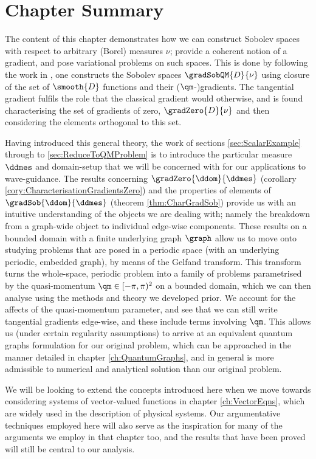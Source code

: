 \section{Chapter Summary}
The content of this chapter demonstrates how we can construct Sobolev spaces with respect to arbitrary (Borel) measures $\nu$; provide a coherent notion of a gradient, and pose variational problems on such spaces.
This is done by following the work in \cite{zhikov2000extension}, one constructs the Sobolev spaces $\gradSobQM{D}{\nu}$ using closure of the set of $\smooth{D}$ functions and their ($\qm$-)gradients.
The tangential gradient fulfils the role that the classical gradient would otherwise, and is found characterising the set of gradients of zero, $\gradZero{D}{\nu}$ and then considering the elements orthogonal to this set. \newline

Having introduced this general theory, the work of sections \ref{sec:ScalarExample} through to \ref{sec:ReduceToQMProblem} is to introduce the particular measure $\ddmes$ and domain-setup that we will be concerned with for our applications to wave-guidance.
The results concerning $\gradZero{\ddom}{\ddmes}$ (corollary \ref{cory:CharacterisationGradientsZero}) and the properties of elements of $\gradSob{\ddom}{\ddmes}$ (theorem \ref{thm:CharGradSob}) provide us with an intuitive understanding of the objects we are dealing with; namely the breakdown from a graph-wide object to individual edge-wise components.
These results on a bounded domain with a finite underlying graph $\graph$ allow us to move onto studying problems that are posed in a periodic space (with an underlying periodic, embedded graph), by means of the Gelfand transform.
This transform turns the whole-space, periodic problem into a family of problems parametrised by the quasi-momentum $\qm\in[-\pi,\pi)^2$ on a bounded domain, which we can then analyse using the methods and theory we developed prior.
We account for the affects of the quasi-momentum parameter, and see that we can still write tangential gradients edge-wise, and these include terms involving $\qm$.
This allows us (under certain regularity assumptions) to arrive at an equivalent quantum graphs formulation for our original problem, which can be approached in the manner detailed in chapter \ref{ch:QuantumGraphs}, and in general is more admissible to numerical and analytical solution than our original problem. \newline

We will be looking to extend the concepts introduced here when we move towards considering systems of vector-valued functions in chapter \ref{ch:VectorEqns}, which are widely used in the description of physical systems.
Our argumentative techniques employed here will also serve as the inspiration for many of the arguments we employ in that chapter too, and the results that have been proved will still be central to our analysis.